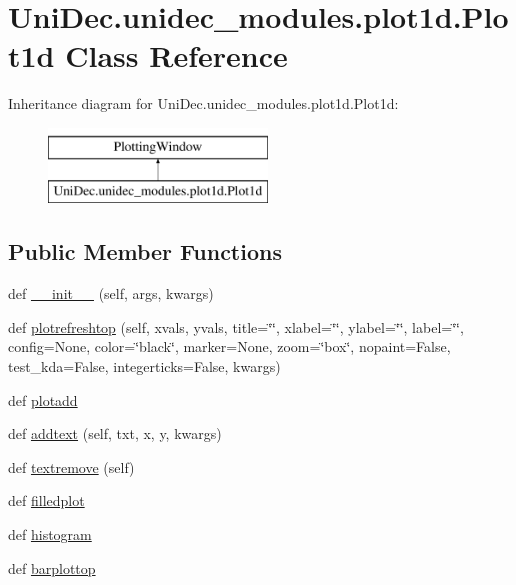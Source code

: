 \hypertarget{class_uni_dec_1_1unidec__modules_1_1plot1d_1_1_plot1d}{}\section{Uni\+Dec.\+unidec\+\_\+modules.\+plot1d.\+Plot1d Class Reference}
\label{class_uni_dec_1_1unidec__modules_1_1plot1d_1_1_plot1d}
Inheritance diagram for Uni\+Dec.\+unidec\+\_\+modules.\+plot1d.\+Plot1d\+:\begin{figure}[H]
\begin{center}
\leavevmode
\includegraphics[height=2.000000cm]{class_uni_dec_1_1unidec__modules_1_1plot1d_1_1_plot1d}
\end{center}
\end{figure}
\subsection*{Public Member Functions}
\begin{DoxyCompactItemize}
\item 
def \hyperlink{class_uni_dec_1_1unidec__modules_1_1plot1d_1_1_plot1d_a7a1a69f6af55c446f938af82b9fb96c8}{\+\_\+\+\_\+init\+\_\+\+\_\+} (self, args, kwargs)
\item 
def \hyperlink{class_uni_dec_1_1unidec__modules_1_1plot1d_1_1_plot1d_adbb157c158fd9d26712fba380b5eb382}{plotrefreshtop} (self, xvals, yvals, title=\char`\"{}\char`\"{}, xlabel=\char`\"{}\char`\"{}, ylabel=\char`\"{}\char`\"{}, label=\char`\"{}\char`\"{}, config=None, color=\char`\"{}black\char`\"{}, marker=None, zoom=\char`\"{}box\char`\"{}, nopaint=False, test\+\_\+kda=False, integerticks=False, kwargs)
\item 
def \hyperlink{class_uni_dec_1_1unidec__modules_1_1plot1d_1_1_plot1d_a6bc43ba5122b583355251181c1122912}{plotadd}
\item 
def \hyperlink{class_uni_dec_1_1unidec__modules_1_1plot1d_1_1_plot1d_a5aa9e32aa4c760f3b7bc2f192819930d}{addtext} (self, txt, x, y, kwargs)
\item 
def \hyperlink{class_uni_dec_1_1unidec__modules_1_1plot1d_1_1_plot1d_a77b843bb4cc41b1d9faf9bf0c3970bfe}{textremove} (self)
\item 
def \hyperlink{class_uni_dec_1_1unidec__modules_1_1plot1d_1_1_plot1d_a35a87cdee3f5b98c7c387c8832f0e6aa}{filledplot}
\item 
def \hyperlink{class_uni_dec_1_1unidec__modules_1_1plot1d_1_1_plot1d_a9b0bbb26eed816cd99fc3ee7fcef7312}{histogram}
\item 
def \hyperlink{class_uni_dec_1_1unidec__modules_1_1plot1d_1_1_plot1d_a0d4ecb314395fb6d845521d770878fac}{barplottop}
\end{DoxyCompactItemize}
